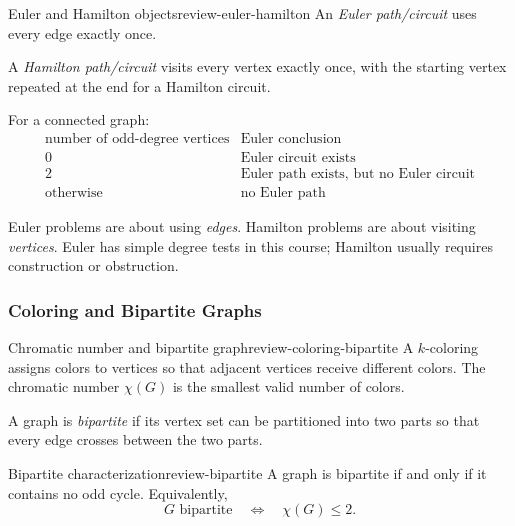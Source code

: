 \begin{definition}{Euler and Hamilton objects}{review-euler-hamilton}
An \emph{Euler path/circuit} uses every edge exactly once.

A \emph{Hamilton path/circuit} visits every vertex exactly once, with the starting vertex repeated at the end for a Hamilton circuit.
\end{definition}

\begin{keyformula}[title={Euler criteria for connected graphs}]
For a connected graph:
\[
\begin{array}{c|c}
\text{number of odd-degree vertices} & \text{Euler conclusion} \\ \hline
0 & \text{Euler circuit exists} \\
2 & \text{Euler path exists, but no Euler circuit} \\
\text{otherwise} & \text{no Euler path}
\end{array}
\]
\end{keyformula}

\begin{commonmistake}[title={Euler versus Hamilton}]
Euler problems are about using \emph{edges}. Hamilton problems are about visiting \emph{vertices}. Euler has simple degree tests in this course; Hamilton usually requires construction or obstruction.
\end{commonmistake}

\subsubsection{Coloring and Bipartite Graphs}

\begin{definition}{Chromatic number and bipartite graph}{review-coloring-bipartite}
A \(k\)-coloring assigns colors to vertices so that adjacent vertices receive different colors. The chromatic number \(\chi(G)\) is the smallest valid number of colors.

A graph is \emph{bipartite} if its vertex set can be partitioned into two parts so that every edge crosses between the two parts.
\end{definition}

\begin{theorem}{Bipartite characterization}{review-bipartite}
A graph is bipartite if and only if it contains no odd cycle. Equivalently,
\[
G\text{ bipartite}
\quad\Longleftrightarrow\quad
\chi(G)\le 2.
\]
\end{theorem}


